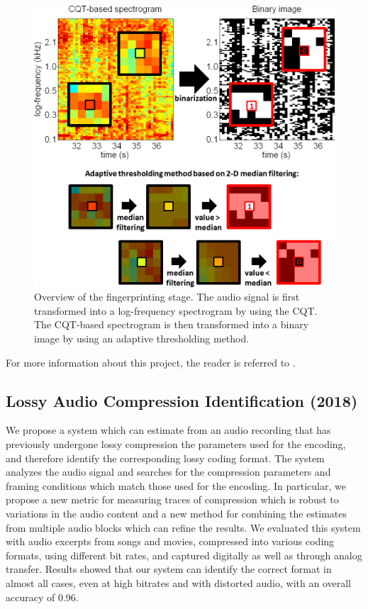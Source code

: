\documentclass{article}
\begin{document}
\begin{figure}[!htb]
\centering
\includegraphics[width=\columnwidth]{Images/thresholding.png}
\caption{Overview of the fingerprinting stage. The audio signal is first transformed into a log-frequency spectrogram by using the CQT. The CQT-based spectrogram is then transformed into a binary image by using an adaptive thresholding method.}
\label{fig:thresholding}
\end{figure}

For more information about this project, the reader is referred to \cite{inproceedings_rafii_may2014}.


\subsection{Lossy Audio Compression Identification (2018)}
\label{ssec:compression}

We propose a system which can estimate from an audio recording that has previously undergone lossy compression the parameters used for the encoding, and therefore identify the corresponding lossy coding format. The system analyzes the audio signal and searches for the compression parameters and framing conditions which match those used for the encoding. In particular, we propose a new metric for measuring traces of compression which is robust to variations in the audio content and a new method for combining the estimates from multiple audio blocks which can refine the results. We evaluated this system with audio excerpts from songs and movies, compressed into various coding formats, using different bit rates, and captured digitally as well as through analog transfer. Results showed that our system can identify the correct format in almost all cases, even at high bitrates and with distorted audio, with an overall accuracy of 0.96.
\end{document}
